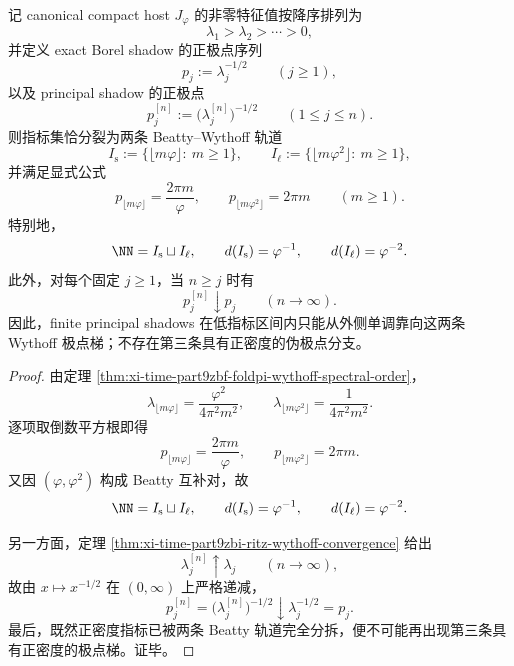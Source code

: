 \begin{theorem}\label{thm:conclusion-principal-shadow-wythoff-pole-density-rigidity}
记 canonical compact host \(J_\varphi\) 的非零特征值按降序排列为
\[
\lambda_1>\lambda_2>\cdots>0,
\]
并定义 exact Borel shadow 的正极点序列
\[
p_j:=\lambda_j^{-1/2}
\qquad (j\ge 1),
\]
以及 principal shadow 的正极点
\[
p_j^{[n]}:=\bigl(\lambda_j^{[n]}\bigr)^{-1/2}
\qquad (1\le j\le n).
\]
则指标集恰分裂为两条 Beatty--Wythoff 轨道
\[
I_{\mathrm{s}}
:=
\{\lfloor m\varphi\rfloor:\ m\ge 1\},
\qquad
I_{\mathrm{\ell}}
:=
\{\lfloor m\varphi^2\rfloor:\ m\ge 1\},
\]
并满足显式公式
\[
p_{\lfloor m\varphi\rfloor}=\frac{2\pi m}{\varphi},
\qquad
p_{\lfloor m\varphi^2\rfloor}=2\pi m
\qquad (m\ge 1).
\]
特别地，
\[
\NN=I_{\mathrm{s}}\sqcup I_{\mathrm{\ell}},
\qquad
d(I_{\mathrm{s}})=\varphi^{-1},
\qquad
d(I_{\mathrm{\ell}})=\varphi^{-2}.
\]
此外，对每个固定 \(j\ge 1\)，当 \(n\ge j\) 时有
\[
p_j^{[n]}\downarrow p_j
\qquad (n\to\infty).
\]
因此，finite principal shadows 在低指标区间内只能从外侧单调靠向这两条 Wythoff 极点梯；不存在第三条具有正密度的伪极点分支。
\end{theorem}
\begin{proof}
由定理 \ref{thm:xi-time-part9zbf-foldpi-wythoff-spectral-order}，
\[
\lambda_{\lfloor m\varphi\rfloor}
=
\frac{\varphi^2}{4\pi^2m^2},
\qquad
\lambda_{\lfloor m\varphi^2\rfloor}
=
\frac{1}{4\pi^2m^2}.
\]
逐项取倒数平方根即得
\[
p_{\lfloor m\varphi\rfloor}=\frac{2\pi m}{\varphi},
\qquad
p_{\lfloor m\varphi^2\rfloor}=2\pi m.
\]
又因 \((\varphi,\varphi^2)\) 构成 Beatty 互补对，故
\[
\NN=I_{\mathrm{s}}\sqcup I_{\mathrm{\ell}},
\qquad
d(I_{\mathrm{s}})=\varphi^{-1},
\qquad
d(I_{\mathrm{\ell}})=\varphi^{-2}.
\]

另一方面，定理 \ref{thm:xi-time-part9zbi-ritz-wythoff-convergence} 给出
\[
\lambda_j^{[n]}\uparrow \lambda_j
\qquad (n\to\infty),
\]
故由 \(x\mapsto x^{-1/2}\) 在 \((0,\infty)\) 上严格递减，
\[
p_j^{[n]}=\bigl(\lambda_j^{[n]}\bigr)^{-1/2}\downarrow \lambda_j^{-1/2}=p_j.
\]
最后，既然正密度指标已被两条 Beatty 轨道完全分拆，便不可能再出现第三条具有正密度的极点梯。证毕。
\end{proof}

